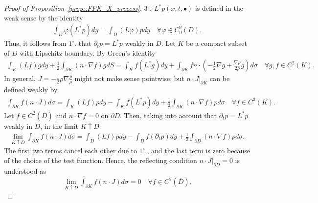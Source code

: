 \documentclass[11pt]{article}
\numberwithin{equation}{section}
\theoremstyle{definition}
\begin{document}
\begin{proof}[Proof of Proposition~\ref{prop::FPK_X_process}]
$3^{\circ}.$ $L^{*}p(x,t,\bullet)$ is defined in the weak sense by the identity
\begin{align*}
    \int_{D}\varphi (L^{*}p)dy = \int_{D}(L\varphi)pdy\quad\forall\varphi\in C^{2}_{0}(D).
\end{align*}
Thus, it follows from $1^{\circ}.$ that $\partial_{t}p = L^{*}p$ weakly in $D$.
Let $K$ be a compact subset of $D$ with Lipschitz boundary. By Green's identity
\begin{align*}
    \int_{K}(Lf)gdy + \frac{1}{2}\int_{\partial K } (n\cdot\nabla f)gdS 
    = \int_{K}f (L^{*}g)dy 
    + \int_{\partial K}f n\cdot \left(-\frac{1}{2}\nabla g 
    + \frac{\nabla\rho}{2\rho} g\right)d\sigma\quad \forall g,f \in C^{2}(K).
\end{align*}
In general, $J = -\frac{1}{2}\rho\nabla \frac{p}{\rho}$ might not make sense pointwise, but $n\cdot J|_{\partial K}$ can be defined weakly by
\begin{align*}
    \int_{\partial K}f (n\cdot J)d\sigma 
    = \int_{K}(Lf)pdy 
    - \int_{K}f (L^{*}p)dy 
    + \frac{1}{2}\int_{\partial K } (n\cdot\nabla f)pd\sigma\quad \forall f \in C^{2}(K).
\end{align*}
Let $f\in C^{2}(\overline{D})$ and $n\cdot\nabla f=0$ on $\partial D$. Then, taking into account that $\partial_{t}p = L^{*}p$ weakly in $D$, in the limit $K\uparrow D$
\begin{align*}
    \lim\limits_{K\uparrow D}\int_{\partial K}f (n\cdot J)d\sigma  
    =\int_{D}(Lf)pdy
    - \int_{D}f (\partial_{t}p)dy
    + \frac{1}{2}\int_{\partial D} (n\cdot\nabla f)pd\sigma.
\end{align*}
The first two terms cancel each other due to $1^{\circ}.$, and the last term is zero because of the choice of the test function. Hence, the reflecting condition $n\cdot J|_{\partial D}=0$ is understood as 
\begin{align*}
    \lim\limits_{K\uparrow D}\int_{\partial K}f (n\cdot J)d\sigma  
    =0 \quad \forall f\in C^{2}(\overline{D}).
\end{align*}
\end{proof}
\end{document}
